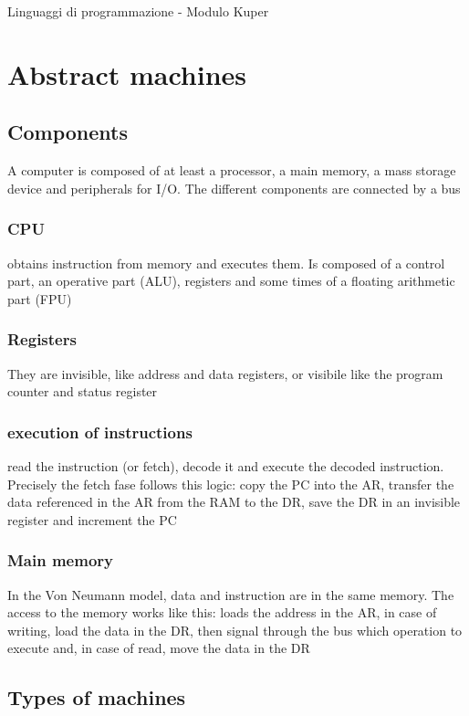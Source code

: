 \documentclass[12pt, a4paper]{article}
\begin{document}
Linguaggi di programmazione - Modulo Kuper

\section{Abstract machines}

\subsection{Components}
A computer is composed of at least a processor, a main memory, a mass storage device and peripherals for I/O.
The different components are connected by a bus

\subsubsection{CPU}
obtains instruction from memory and executes them. Is composed of a control part, an operative part (ALU), registers
and some times of a floating arithmetic part (FPU)

\subsubsection{Registers}
They are invisible, like address and data registers, or visibile like the program counter and status register

\subsubsection{execution of instructions}
read the instruction (or fetch), decode it and execute the decoded instruction. Precisely the fetch fase follows this
logic: copy the PC into the AR, transfer the data referenced in the AR from the RAM to the DR, save the DR in an
invisible register and increment the PC

\subsubsection{Main memory}
In the Von Neumann model, data and instruction are in the same memory. The access to the memory works like this:
loads the address in the AR, in case of writing, load the data in the DR, then signal through the bus which operation
to execute and, in case of read, move the data in the DR

\subsection{Types of machines}
\end{document}
